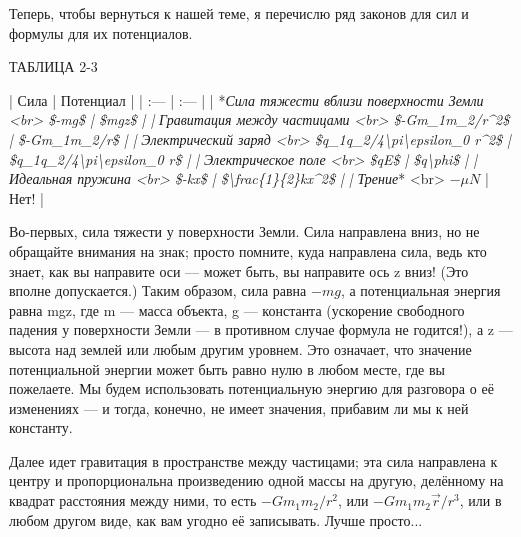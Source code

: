 \documentclass[10pt,oneside]{article}
\begin{document}
Теперь, чтобы вернуться к нашей теме, я перечислю ряд законов для сил и формулы для их потенциалов.\par

ТАБЛИЦА 2-3\par

| Сила | Потенциал | | :--- | :--- | | *\emph{Сила тяжести вблизи поверхности Земли}\emph{ <br> \$-mg\$ | \$mgz\$ | | }\emph{Гравитация между частицами}\emph{ <br> \$-Gm\_1m\_2/r\textasciicircum{}2\$ | \$-Gm\_1m\_2/r\$ | | }\emph{Электрический заряд}\emph{ <br> \$q\_1q\_2/4\textbackslash{}pi\textbackslash{}epsilon\_0 r\textasciicircum{}2\$ | \$q\_1q\_2/4\textbackslash{}pi\textbackslash{}epsilon\_0 r\$ | | }\emph{Электрическое поле}\emph{ <br> \$qE\$ | \$q\textbackslash{}phi\$ | | }\emph{Идеальная пружина}\emph{ <br> \$-kx\$ | \$\textbackslash{}frac\{1\}\{2\}kx\textasciicircum{}2\$ | | }\emph{Трение}* <br> \(-\mu N\) | Нет! |\par

Во-первых, сила тяжести у поверхности Земли. Сила направлена вниз, но не обращайте внимания на знак; просто помните, куда направлена сила, ведь кто знает, как вы направите оси --- может быть, вы направите ось z вниз! (Это вполне допускается.) Таким образом, сила равна \(-mg\), а потенциальная энергия равна mgz, где m --- масса объекта, g --- константа (ускорение свободного падения у поверхности Земли --- в противном случае формула не годится!), а z --- высота над землей или любым другим уровнем. Это означает, что значение потенциальной энергии может быть равно нулю в любом месте, где вы пожелаете. Мы будем использовать потенциальную энергию для разговора о её изменениях --- и тогда, конечно, не имеет значения, прибавим ли мы к ней константу.\par

Далее идет гравитация в пространстве между частицами; эта сила направлена к центру и пропорциональна произведению одной массы на другую, делённому на квадрат расстояния между ними, то есть \(-Gm_1m_2/r^2\), или \(-Gm_1m_2\vec{r}/r^3\), или в любом другом виде, как вам угодно её записывать. Лучше просто...\par
\end{document}
